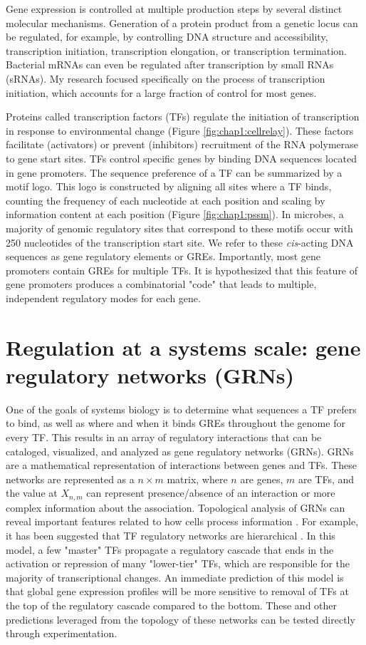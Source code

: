 \documentclass{article}
\begin{document}
Gene expression is controlled at multiple production steps by several distinct molecular mechanisms. Generation of a protein product from a genetic locus can be regulated, for example, by controlling DNA structure and accessibility, transcription initiation, transcription elongation, or transcription termination. Bacterial mRNAs can even be regulated after transcription by small RNAs (sRNAs). My research focused specifically on the process of transcription initiation, which accounts for a large fraction of control for most genes. 

Proteins called transcription factors (TFs) regulate the initiation of transcription in response to environmental change (Figure \ref{fig:chap1:cellrelay}). These factors facilitate (activators) or prevent (inhibitors) recruitment of the RNA polymerase to gene start sites. TFs control specific genes by binding DNA sequences located in gene promoters. The sequence preference of a TF can be summarized by a motif logo. This logo is constructed by aligning all sites where a TF binds, counting the frequency of each nucleotide at each position and scaling by information content at each position (Figure \ref{fig:chap1:pssm}). In microbes, a majority of genomic regulatory sites that correspond to these motifs occur with 250 nucleotides of the transcription start site. We refer to these \textit{cis}-acting DNA sequences as gene regulatory elements or GREs. Importantly, most gene promoters contain GREs for multiple TFs. It is hypothesized that this feature of gene promoters produces a combinatorial "code" that leads to multiple, independent regulatory modes for each gene. 

\section{Regulation at a systems scale: gene regulatory networks (GRNs)}

One of the goals of systems biology is to determine what sequences a TF prefers to bind, as well as where and when it binds GREs throughout the genome for every TF. This results in an array of regulatory interactions that can be cataloged, visualized, and analyzed as gene regulatory networks (GRNs). GRNs are a mathematical representation of interactions between genes and TFs. These networks are represented as a $n \times m$ matrix, where $n$ are genes, $m$ are TFs, and the value at $X_{n,m}$ can represent presence/absence of an interaction or more complex information about the association. Topological analysis of GRNs can reveal important features related to how cells process information \cite{barabasi_network_2004}. For example, it has been suggested that TF regulatory networks are hierarchical \cite{yu_genomic_2006}. In this model, a few "master" TFs propagate a regulatory cascade that ends in the activation or repression of many "lower-tier" TFs, which are responsible for the majority of transcriptional changes. An immediate prediction of this model is that global gene expression profiles will be more sensitive to removal of TFs at the top of the regulatory cascade compared to the bottom. These and other predictions leveraged from the topology of these networks can be tested directly through experimentation. 
\end{document}
